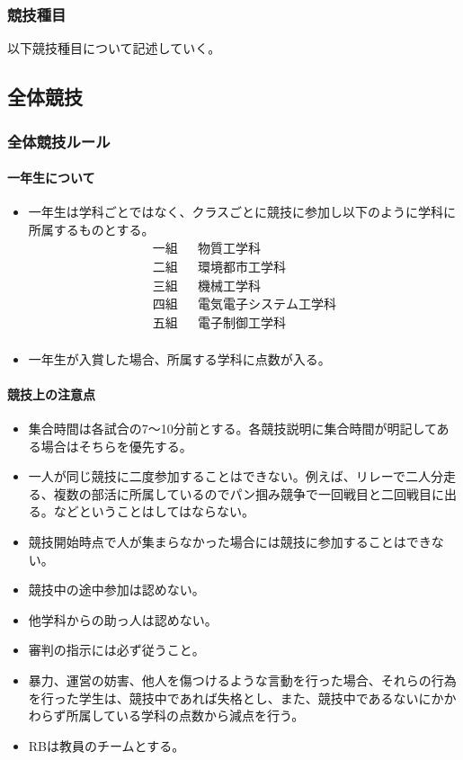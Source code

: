 \documentclass[titlepage]{jarticle}
\begin{document}
  \section{競技種目}
   以下競技種目について記述していく。
 \clearpage
 \setcounter{section}{0}
 \begin{center}
  \part*{全体競技}
 \end{center}
 \section{全体競技ルール}
  \subsection{一年生について}
   \begin{itemize}
    \item 一年生は学科ごとではなく、クラスごとに競技に参加し以下のように学科に所属するものとする。
    \begin{eqnarray*}
     一組&&物質工学科\\
     二組&&環境都市工学科\\
     三組&&機械工学科\\
     四組&&電気電子システム工学科\\
     五組&&電子制御工学科\\
    \end{eqnarray*}
    \item 一年生が入賞した場合、所属する学科に点数が入る。
   \end{itemize}
  \subsection{競技上の注意点}
   \begin{itemize} 
    \item 集合時間は各試合の7～10分前とする。各競技説明に集合時間が明記してある場合はそちらを優先する。
   \item 一人が同じ競技に二度参加することはできない。例えば、リレーで二人分走る、複数の部活に所属しているのでパン掴み競争で一回戦目と二回戦目に出る。などということはしてはならない。
  \item 競技開始時点で人が集まらなかった場合には競技に参加することはできない。
    \item 競技中の途中参加は認めない。
    \item 他学科からの助っ人は認めない。 
    \item 審判の指示には必ず従うこと。
    \item 暴力、運営の妨害、他人を傷つけるような言動を行った場合、それらの行為を行った学生は、競技中であれば失格とし、また、競技中であるないにかかわらず所属している学科の点数から減点を行う。 
    \item RBは教員のチームとする。
   \end{itemize}
\end{document}
